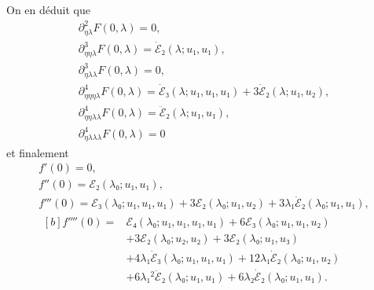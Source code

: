 \documentclass[12pt, final]{amsart}
\theoremstyle{definition}
\begin{document}
On en déduit que
\begin{gather}
  ∂_{ηλ}^2 F(0, λ) = 0,\\
  ∂_{ηηλ}^3 F(0, λ) = \dot{ℰ}₂(λ; u₁, u₁),\\
  ∂_{ηλλ}^3 F(0, λ) = 0,\\
  ∂_{ηηηλ}^4 F(0, λ) = \dot{ℰ}₃(λ; u₁, u₁, u₁) + 3\dot{ℰ}₂(λ; u₁, u₂),\\
  ∂_{ηηλλ}^4 F(0, λ) = \ddot{ℰ}₂(λ; u₁, u₁),\\
  ∂_{ηλλλ}^4 F(0, λ) = 0
\end{gather}
et finalement
\begin{gather}
  f'(0) = 0,\\
  f''(0) = ℰ₂(λ₀; u₁, u₁),\\
  f'''(0) =ℰ₃(λ₀; u₁, u₁, u₁) + 3ℰ₂(λ₀; u₁, u₂) + 3λ₁ \dot{ℰ}₂(λ₀; u₁, u₁),\\
  \begin{aligned}[b]
    f''''(0) ={}
    & ℰ₄(λ₀; u₁, u₁, u₁, u₁) + 6ℰ₃(λ₀; u₁, u₁, u₂)\\
    & + 3ℰ₂(λ₀; u₂, u₂) + 3ℰ₂(λ₀; u₁, u₃)\\
    & + 4 λ₁ \dot{ℰ}₃(λ₀; u₁, u₁, u₁) + 12 λ₁ \dot{ℰ}₂(λ₀; u₁, u₂)\\
    & + 6λ₁^2 \ddot{ℰ}₂(λ₀; u₁, u₁) + 6λ₂ \dot{ℰ}₂(λ₀; u₁, u₁).
  \end{aligned}
\end{gather}
\end{document}
